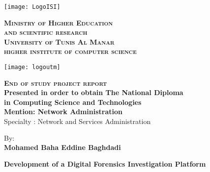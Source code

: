 \thispagestyle{empty}
\hspace{-1cm}
\begin{minipage}[l]{0.2\columnwidth}
\texttt{[image: LogoISI]}\\
\end{minipage}
\hfill
\begin{minipage}[l]{0.6\columnwidth}
\centering
\footnotesize

\textbf{\textsc{Ministry of Higher Education\\
and scientific research}}\\
\textbf{\textsc{University of Tunis Al Manar}}\\
\textbf{\textsc{higher institute of computer science}}
\end{minipage}
\hfill
\begin{minipage}[l]{0.2\columnwidth}
\texttt{[image: logoutm]}\\
\end{minipage}
\begin{center}
    
\end{center}
\begin{center}
{\large{\textbf{\textsc{End of study project report}}}}\\
{\textbf{Presented in order to obtain The National Diploma}}\\
{\textbf{in Computing Science and Technologies}}\\
{\textbf{Mention: Network Administration}}\\
{Specialty : Network and Services Administration}
\end{center}
\begin{center}
\textrm{By:}\\
{\large\textbf{Mohamed Baha Eddine Baghdadi}}\\ 
\vskip1cm
    \begin{minipage}[l]{1\columnwidth}
  
        \begin{tcolorbox}[colframe=yellowx,colback=white,boxrule=2pt,arc=10pt,height=30mm]
         \vskip3mm
            \centering
        {\huge\textbf{Development of a Digital Forensics Investigation Platform}} 
         
        \end{tcolorbox}
    \end{minipage}
\end{center}
